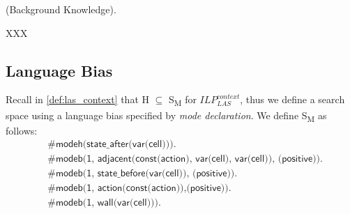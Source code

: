 
\begin{examp} \normalfont (Background Knowledge).

XXX
\end{examp}

\subsection{Language Bias}
\label{subsec:language_bias}
Recall in \ref{def:las_context} that H $\subseteq$ S\textsubscript{M} for $ILP_{LAS}^{context}$, thus we define a search space using a language bias specified by \textit{mode declaration}.
We define S\textsubscript{M} as follows:
\begin{equation} \label{eq:sm}
\begin{split}
&\textsf{\#modeh(state\_after(var(cell))).}\\
&\textsf{\#modeb(1, adjacent(const(action), var(cell), var(cell)), (positive)).} \\
&\textsf{\#modeb(1, state\_before(var(cell)), (positive)).} \\
&\textsf{\#modeb(1, action(const(action)),(positive)).} \\
&\textsf{\#modeb(1, wall(var(cell))).} \\
\end{split}
\end{equation}


